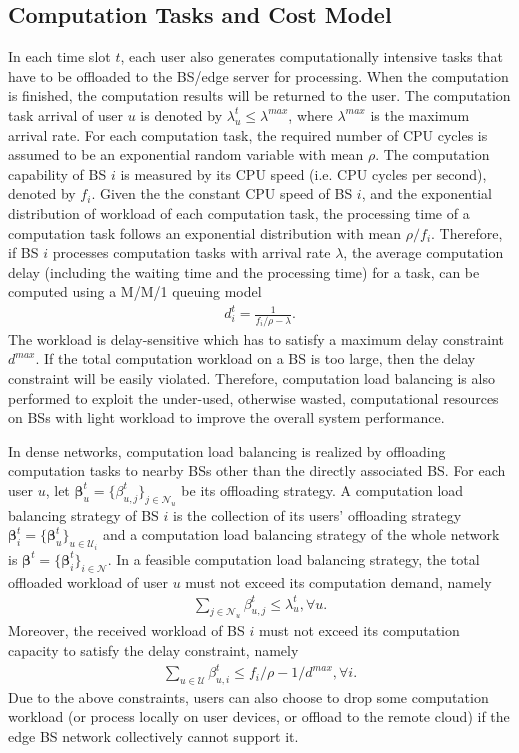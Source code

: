 \documentclass[12pt, draftclsnofoot, letterpaper, onecolumn]{IEEEtran}
\begin{document}
\subsection{Computation Tasks and Cost Model}
In each time slot $t$, each user also generates computationally intensive tasks that have to be offloaded to the BS/edge server for processing. When the computation is finished, the computation results will be returned to the user. The computation task arrival of user $u$ is denoted by $\lambda^t_u \leq \lambda^{max}$, where $\lambda^{max}$ is the maximum arrival rate. For each computation task, the required number of CPU cycles is assumed to be an exponential random variable with mean $\rho$. The computation capability of BS $i$ is measured by its CPU speed (i.e. CPU cycles per second), denoted by $f_i$. Given the the constant CPU speed of BS $i$, and the exponential distribution of workload of each computation task, the processing time of a computation task follows an exponential distribution with mean $\rho/f_i$. Therefore, if BS $i$ processes computation tasks with arrival rate $\lambda$, the average computation delay (including the waiting time and the processing time) for a task, can be computed using a M/M/1 queuing model
\begin{align}
d_i^t = \frac{1}{f_i/\rho - \lambda}.
\end{align}
The workload is delay-sensitive which has to satisfy a maximum delay constraint $d^{max}$. If the total computation workload on a BS is too large, then the delay constraint will be easily violated. Therefore, computation load balancing is also performed to exploit the under-used, otherwise wasted, computational resources on BSs with light workload to improve the overall system performance.

In dense networks, computation load balancing is realized by offloading computation tasks to nearby BSs other than the directly associated BS. For each user $u$, let $\bm\beta^t_u =\{\beta^t_{u, j}\}_{j\in\mathcal{N}_u}$ be its offloading strategy. A computation load balancing strategy of BS $i$ is the collection of its users' offloading strategy $\bm\beta^t_i = \{\bm\beta^t_u\}_{u\in\mathcal{U}_i}$ and a computation load balancing strategy of the whole network is $\bm\beta^t = \{\bm\beta^t_i\}_{i\in\mathcal{N}}$. In a feasible computation load balancing strategy, the total offloaded workload of user $u$ must not exceed its computation demand, namely
\begin{align}\label{demand1}
\sum_{j\in\mathcal{N}_u} \beta^t_{u,j} \leq \lambda^t_u, \forall u.
\end{align}
Moreover, the received workload of BS $i$ must not exceed its computation capacity to satisfy the delay constraint, namely
\begin{align}\label{capacity}
\sum_{u \in \mathcal{U}} \beta^t_{u,i} \leq f_i/\rho - 1/d^{max}, \forall i.
\end{align}
Due to the above constraints, users can also choose to drop some computation workload (or process locally on user devices, or offload to the remote cloud) if the edge BS network collectively cannot support it.
\end{document}
